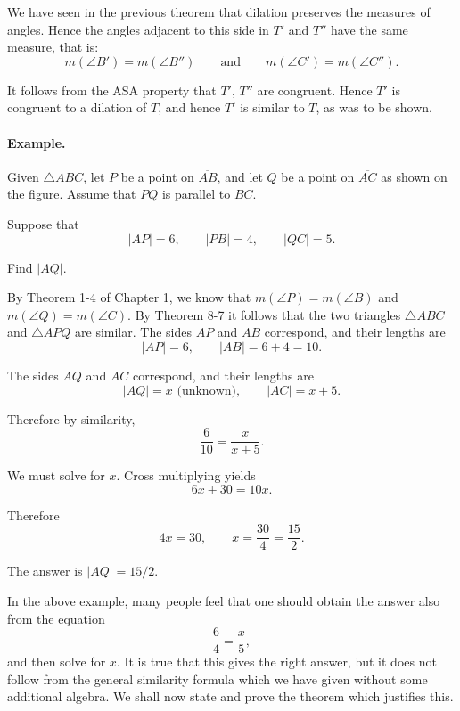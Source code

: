 \documentclass[12pt]{book} %
\begin{document}

We have seen in the previous theorem that dilation preserves the measures of angles. Hence the angles adjacent to this side in $T'$ and $T''$ have the same measure, that is:
\[
m(\angle B')=m(\angle B'')
\qquad \text{and} \qquad
m(\angle C')=m(\angle C'').
\]

It follows from the ASA property that $T'$, $T''$ are congruent. Hence $T'$ is congruent to a dilation of $T$, and hence $T'$ is similar to $T$, as was to be shown.

\paragraph{Example.}
Given $\triangle ABC$, let $P$ be a point on $\overline{AB}$, and let $Q$ be a point on $\overline{AC}$ as shown on the figure. Assume that $PQ$ is parallel to $BC$.


Suppose that
\[
|AP|=6,\qquad |PB|=4,\qquad |QC|=5.
\]

Find $|AQ|$.

By Theorem 1-4 of Chapter 1, we know that $m(\angle P)=m(\angle B)$ and $m(\angle Q)=m(\angle C)$. By Theorem 8-7 it follows that the two triangles $\triangle ABC$ and $\triangle APQ$ are similar. The sides $AP$ and $AB$ correspond, and their lengths are
\[
|AP|=6,\qquad |AB|=6+4=10.
\]

The sides $AQ$ and $AC$ correspond, and their lengths are
\[
|AQ|=x \text{ (unknown)},\qquad |AC|=x+5.
\]

Therefore by similarity,
\[
\frac{6}{10}=\frac{x}{x+5}.
\]

We must solve for $x$. Cross multiplying yields
\[
6x+30=10x.
\]

Therefore
\[
4x=30,\qquad x=\frac{30}{4}=\frac{15}{2}.
\]

The answer is $|AQ|=15/2$.

In the above example, many people feel that one should obtain the answer also from the equation
\[
\frac{6}{4}=\frac{x}{5},
\]
and then solve for $x$. It is true that this gives the right answer, but it does not follow from the general similarity formula which we have given without some additional algebra. We shall now state and prove the theorem which justifies this.

\end{document}
